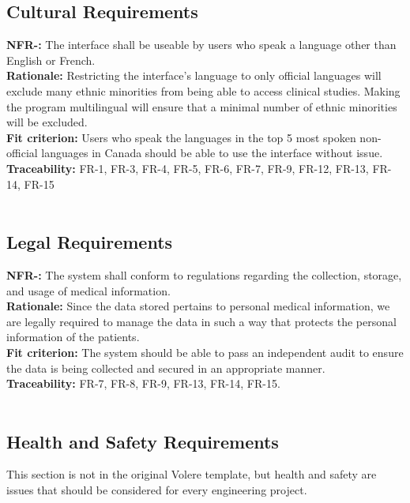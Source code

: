 \documentclass[12pt, titlepage]{article}
\newcounter{NFR_Counter}
\newcounter{FR_Counter}
\begin{document}
\subsection{Cultural Requirements}
\noindent\textbf{NFR-\the\value{NFR_Counter}:}
The interface shall be useable by users who speak a language other than English or French.  \\
\textbf{Rationale:}
Restricting the interface's language to only official languages will exclude many ethnic minorities from being able to access clinical studies. Making the program multilingual will ensure that a minimal number of ethnic minorities will be excluded. \\
\textbf{Fit criterion:}
Users who speak the languages in the top 5 most spoken non-official languages in Canada should be able to use the interface without issue. \\
\textbf{Traceability:}
FR-1, FR-3, FR-4, FR-5, FR-6, FR-7, FR-9, FR-12, FR-13, FR-14, FR-15 \\~\\
\addtocounter{NFR_Counter}{1}

\subsection{Legal Requirements}
\noindent\textbf{NFR-\the\value{NFR_Counter}:}
The system shall conform to regulations regarding the collection, storage, and usage of medical information.  \\
\textbf{Rationale:}
Since the data stored pertains to personal medical information, we are legally required to manage the data in such a way that protects the personal information of the patients. \\
\textbf{Fit criterion:}
The system should be able to pass an independent audit to ensure the data is being collected and secured in an appropriate manner. \\
\textbf{Traceability:}
FR-7, FR-8, FR-9, FR-13, FR-14, FR-15. \\~\\
\addtocounter{NFR_Counter}{1}

\subsection{Health and Safety Requirements}

This section is not in the original Volere template, but health and safety are
issues that should be considered for every engineering project.
\end{document}

